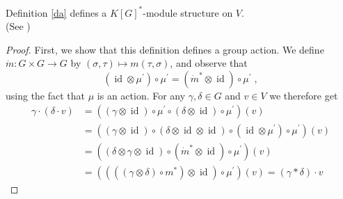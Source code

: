 \begin{proposition}\label{do}
  Definition \ref{da} defines a $K[G]^\ast$-module structure on $V$.\\
  (See \cite[A2.10]{DK15})
\end{proposition}

\begin{proof}
  First, we show that this definition defines a group action.
  We define $\dot{m} \colon G \times G \rightarrow G$ by $(\sigma,\tau) \mapsto m(\tau,\sigma)$, and observe that
  \begin{equation*}
    (\operatorname{id} \otimes \mu^\prime)\circ\mu^\prime = (\dot{m}^\ast \otimes \operatorname{id}) \circ \mu^\prime \; ,
  \end{equation*}
  using the fact that $\mu$ is an action.
  For any $\gamma,\delta \in G$ and $v \in V$ we therefore get
  \begin{equation*}
    \begin{aligned}
       \gamma \cdot (\delta \cdot v)
      &= ((\gamma \otimes \operatorname{id})\circ\mu^\prime\circ(\delta \otimes \operatorname{id})\circ\mu^\prime)(v)\\
      &= ((\gamma \otimes \operatorname{id})\circ(\delta \otimes \operatorname{id}\otimes\operatorname{id})\circ(\operatorname{id}\otimes\mu^\prime)\circ\mu^\prime)(v)\\
      &= ((\delta\otimes\gamma\otimes\operatorname{id})\circ(\dot{m}^\ast\otimes\operatorname{id})\circ\mu^\prime)(v)\\
      &= ((((\gamma\otimes\delta)\circ m^\ast)\otimes\operatorname{id})\circ\mu^\prime)(v)
      = (\gamma \ast \delta) \cdot v
    \end{aligned}
  \end{equation*}
  

\end{proof}
